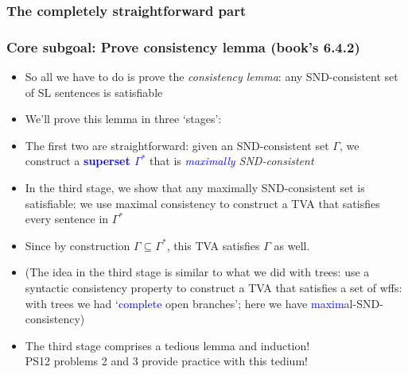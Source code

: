 \subsubsection{The completely straightforward part}

\begin{frame}
\frametitle{Core subgoal: Prove consistency lemma (book's 6.4.2)}

\begin{itemize}[<+->]

\item So all we have to do is prove the \emph{consistency lemma}: any SND-consistent set of SL sentences is satisfiable

\item We'll prove this lemma in three `stages':

\item The first two are straightforward: given an SND-consistent set $\Gamma$, we construct a \textbf{\textcolor{blue}{superset $\Gamma^{\ast}$}} that is \textit{\textcolor{blue}{maximally} SND-consistent}

\item In the third stage, we show that any maximally SND-consistent set is \alert{satisfiable}: we use maximal consistency to construct a TVA that satisfies every sentence in $\Gamma^{\ast}$

\item Since by construction $\Gamma \subseteq \Gamma^{\ast}$, this TVA satisfies $\Gamma$ as well. 

\item \footnotesize{(The idea in the third stage is similar to what we did with trees: use a syntactic consistency property to construct a TVA that satisfies a set of wffs: with trees we had `\textcolor{blue}{complete} \alert{open} branches'; here we have \textcolor{blue}{maximal}-\alert{SND-consistency})} 
\item The third stage comprises a tedious lemma and induction! \\ PS12 problems 2 and 3 provide practice with this tedium! 



\end{itemize}
\end{frame}

